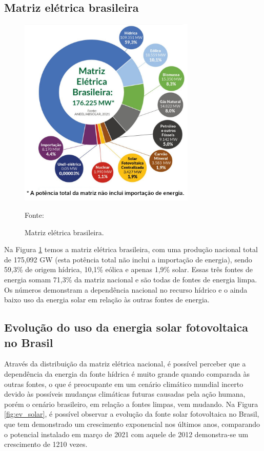 \subsection{Matriz elétrica brasileira}

\begin{figure}[H]
    \centering
    \includegraphics[width=0.75\textwidth]{./Figuras/mz_brasil.jpg}
    \caption{Matriz elétrica brasileira.}{Fonte: \cite{ABSOLAR}}
   \label{fig:mz_brasil}
\end{figure}

Na Figura \ref{fig:mz_brasil} temos a matriz elétrica brasileira, com uma produção nacional total de 175,092 GW (esta potência total não inclui a importação de energia), sendo 59,3\% de origem hídrica, 10,1\% eólica e apenas 1,9\% solar. Essas três fontes de energia somam 71,3\% da matriz nacional e são todas de fontes de energia limpa. Os números demonstram a dependência nacional no recurso hídrico e o ainda baixo uso da energia solar em relação às outras fontes de energia.

\subsection{Evolução do uso da energia solar fotovoltaica no Brasil}

Através da distribuição da matriz elétrica nacional, é possível perceber que a dependência da energia da fonte hídrica é muito grande quando comparada às outras fontes, o que é preocupante em um cenário climático mundial incerto devido às possíveis mudanças climáticas futuras causadas pela ação humana, porém o cenário brasileiro, em relação a fontes limpas, vem mudando. Na Figura \ref{fig:ev_solar}, é possível observar a evolução da fonte solar fotovoltaica no Brasil, que tem demonstrado um crescimento exponencial nos últimos anos, comparando o potencial instalado em março de 2021 com aquele de 2012 demonstra-se um crescimento de 1210 vezes.

